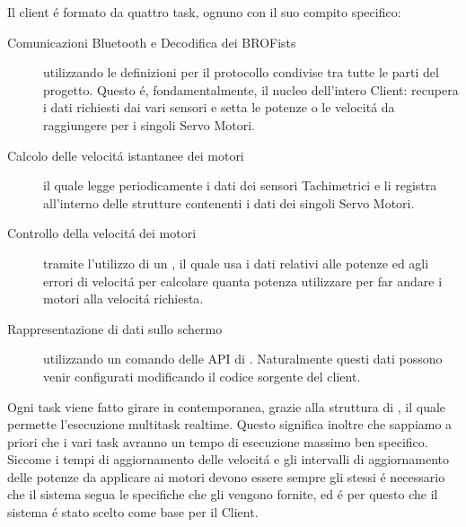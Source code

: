 Il client \'e formato da quattro task, ognuno con il suo compito specifico:
\begin{description}
    \item[Comunicazioni Bluetooth e Decodifica dei BROFists]utilizzando
        le definizioni per il protocollo condivise tra tutte le parti del
        progetto. Questo \'e, fondamentalmente, il nucleo dell'intero
        Client: recupera i dati richiesti dai vari sensori e setta le
        potenze o le velocit\'a da raggiungere per i singoli Servo Motori.
    \item[Calcolo delle velocit\'a istantanee dei motori]il quale legge
        periodicamente i dati dei sensori Tachimetrici e li registra
        all'interno delle strutture contenenti i dati dei singoli Servo
        Motori.
    \item[Controllo della velocit\'a dei motori]tramite l'utilizzo di un
        \PID{}, il quale usa i dati relativi alle
        potenze ed agli errori di velocit\'a per calcolare quanta potenza
        utilizzare per far andare i motori alla velocit\'a richiesta.
    \item[Rappresentazione di dati sullo schermo]utilizzando un comando
        delle API di \nxtOSEK{}. Naturalmente questi dati possono venir
        configurati modificando il codice sorgente del client.
\end{description}
Ogni task viene fatto girare in contemporanea, grazie alla struttura di
\nxtOSEK{}, il quale permette l'esecuzione multitask realtime. 
Questo significa inoltre che sappiamo a priori che i vari task avranno un tempo di
esecuzione massimo ben specifico.
Siccome i tempi di aggiornamento delle velocit\'a e gli intervalli di
aggiornamento delle potenze da applicare ai motori devono essere sempre gli
stessi \'e necessario che il sistema segua le specifiche che gli vengono
fornite, ed \'e per questo che il sistema \nxtOSEK{} \'e stato scelto come
base per il Client.

\cleardoublepage

